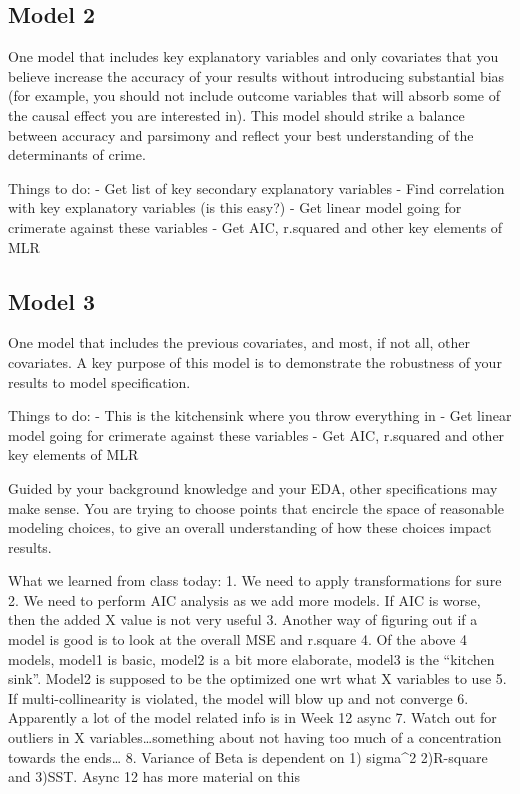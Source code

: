 \documentclass[]{article}
\begin{document}
\subsection{Model 2}\label{model-2}

One model that includes key explanatory variables and only covariates
that you believe increase the accuracy of your results without
introducing substantial bias (for example, you should not include
outcome variables that will absorb some of the causal effect you are
interested in). This model should strike a balance between accuracy and
parsimony and reflect your best understanding of the determinants of
crime.

Things to do: - Get list of key secondary explanatory variables - Find
correlation with key explanatory variables (is this easy?) - Get linear
model going for crimerate against these variables - Get AIC, r.squared
and other key elements of MLR

\subsection{Model 3}\label{model-3}

One model that includes the previous covariates, and most, if not all,
other covariates. A key purpose of this model is to demonstrate the
robustness of your results to model specification.

Things to do: - This is the kitchensink where you throw everything in -
Get linear model going for crimerate against these variables - Get AIC,
r.squared and other key elements of MLR

Guided by your background knowledge and your EDA, other specifications
may make sense. You are trying to choose points that encircle the space
of reasonable modeling choices, to give an overall understanding of how
these choices impact results.

What we learned from class today: 1. We need to apply transformations
for sure 2. We need to perform AIC analysis as we add more models. If
AIC is worse, then the added X value is not very useful 3. Another way
of figuring out if a model is good is to look at the overall MSE and
r.square 4. Of the above 4 models, model1 is basic, model2 is a bit more
elaborate, model3 is the ``kitchen sink''. Model2 is supposed to be the
optimized one wrt what X variables to use 5. If multi-collinearity is
violated, the model will blow up and not converge 6. Apparently a lot of
the model related info is in Week 12 async 7. Watch out for outliers in
X variables\ldots{}something about not having too much of a
concentration towards the ends\ldots{} 8. Variance of Beta is dependent
on 1) sigma\^{}2 2)R-square and 3)SST. Async 12 has more material on
this
\end{document}
